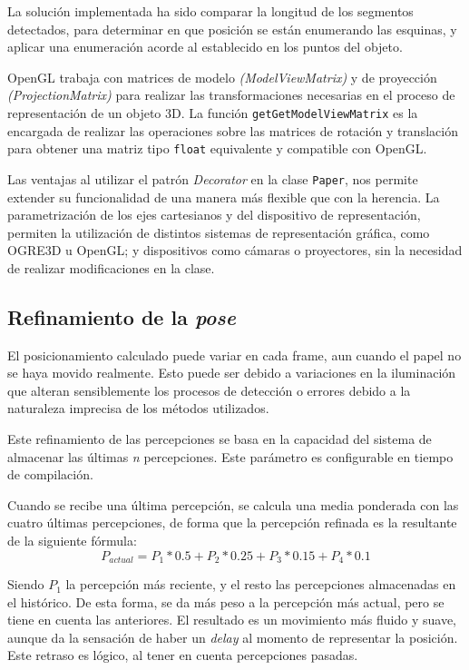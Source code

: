 La solución implementada ha sido comparar la longitud de los segmentos detectados, para determinar en que posición se están enumerando las esquinas, y aplicar una enumeración acorde al establecido en los puntos del objeto.

OpenGL trabaja con matrices de modelo \textit{(ModelViewMatrix)} y de proyección \textit{(ProjectionMatrix)} para realizar las transformaciones necesarias en el proceso de representación de un objeto 3D. La función \texttt{getGetModelViewMatrix} es la encargada de realizar las operaciones sobre las matrices de rotación y translación para obtener una matriz tipo \texttt{float} equivalente y compatible con OpenGL.

Las ventajas al utilizar el patrón \textit{Decorator} en la clase \texttt{Paper}, nos permite extender su funcionalidad de una manera más flexible que con la herencia. La parametrización de los ejes cartesianos y del dispositivo de representación, permiten la utilización de distintos sistemas de representación gráfica, como OGRE3D u OpenGL; y dispositivos como cámaras o proyectores, sin la necesidad de realizar modificaciones en la clase.  


\subsection{Refinamiento de la \emph{pose}}
El posicionamiento calculado puede variar en cada frame, aun cuando el papel no se haya movido
realmente. Esto puede ser debido a variaciones en la iluminación que alteran sensiblemente los
procesos de detección o errores debido a la naturaleza imprecisa de los métodos utilizados.

Este refinamiento de las percepciones se basa en la capacidad del sistema de almacenar las últimas
\textit{n} percepciones. Este parámetro es configurable en tiempo de compilación.

Cuando se recibe una última percepción, se calcula una media ponderada con las cuatro últimas
percepciones, de forma que la percepción refinada es la resultante de la siguiente fórmula:
\begin{equation}
P_{actual} = P_1*0.5 + P_2*0.25 + P_3*0.15 + P_4*0.1
\end{equation}

Siendo $P_1$ la percepción más reciente, y el resto las percepciones almacenadas en el histórico. De esta forma, se da más peso a la percepción más actual, pero se tiene en cuenta las anteriores. El resultado es un movimiento más fluido y suave, aunque da la sensación de haber un \textit{delay} al momento de representar la posición. Este retraso es lógico, al tener en cuenta percepciones pasadas.

